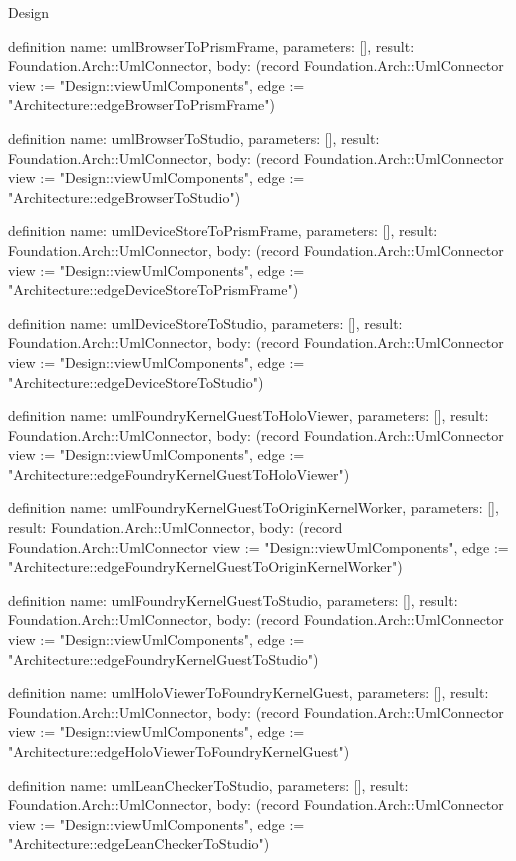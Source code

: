 \begin{lexlean}{Design}
\begin{semanticmodule}
definition{
  name: umlBrowserToPrismFrame,
  parameters: [],
  result: Foundation.Arch::UmlConnector,
  body: (record Foundation.Arch::UmlConnector {view := "Design::viewUmlComponents", edge := "Architecture::edgeBrowserToPrismFrame"})
}

definition{
  name: umlBrowserToStudio,
  parameters: [],
  result: Foundation.Arch::UmlConnector,
  body: (record Foundation.Arch::UmlConnector {view := "Design::viewUmlComponents", edge := "Architecture::edgeBrowserToStudio"})
}

definition{
  name: umlDeviceStoreToPrismFrame,
  parameters: [],
  result: Foundation.Arch::UmlConnector,
  body: (record Foundation.Arch::UmlConnector {view := "Design::viewUmlComponents", edge := "Architecture::edgeDeviceStoreToPrismFrame"})
}

definition{
  name: umlDeviceStoreToStudio,
  parameters: [],
  result: Foundation.Arch::UmlConnector,
  body: (record Foundation.Arch::UmlConnector {view := "Design::viewUmlComponents", edge := "Architecture::edgeDeviceStoreToStudio"})
}

definition{
  name: umlFoundryKernelGuestToHoloViewer,
  parameters: [],
  result: Foundation.Arch::UmlConnector,
  body: (record Foundation.Arch::UmlConnector {view := "Design::viewUmlComponents", edge := "Architecture::edgeFoundryKernelGuestToHoloViewer"})
}

definition{
  name: umlFoundryKernelGuestToOriginKernelWorker,
  parameters: [],
  result: Foundation.Arch::UmlConnector,
  body: (record Foundation.Arch::UmlConnector {view := "Design::viewUmlComponents", edge := "Architecture::edgeFoundryKernelGuestToOriginKernelWorker"})
}

definition{
  name: umlFoundryKernelGuestToStudio,
  parameters: [],
  result: Foundation.Arch::UmlConnector,
  body: (record Foundation.Arch::UmlConnector {view := "Design::viewUmlComponents", edge := "Architecture::edgeFoundryKernelGuestToStudio"})
}

definition{
  name: umlHoloViewerToFoundryKernelGuest,
  parameters: [],
  result: Foundation.Arch::UmlConnector,
  body: (record Foundation.Arch::UmlConnector {view := "Design::viewUmlComponents", edge := "Architecture::edgeHoloViewerToFoundryKernelGuest"})
}

definition{
  name: umlLeanCheckerToStudio,
  parameters: [],
  result: Foundation.Arch::UmlConnector,
  body: (record Foundation.Arch::UmlConnector {view := "Design::viewUmlComponents", edge := "Architecture::edgeLeanCheckerToStudio"})
}


\end{semanticmodule}
\end{lexlean}
